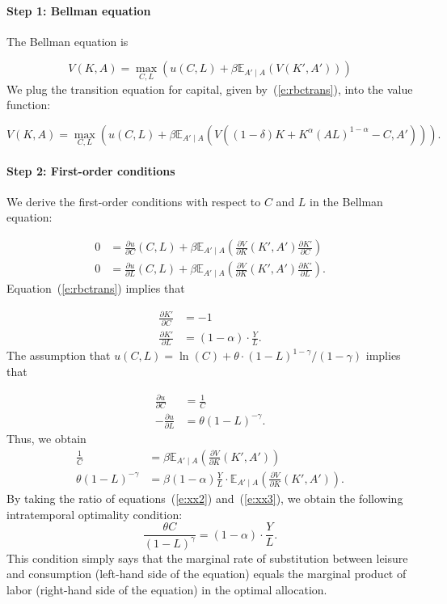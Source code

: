 \documentclass{article}
\begin{document}
\paragraph{Step 1: Bellman equation} The Bellman equation is

\[
V(K,A) = \max_{C,L}\left(u(C,L) +\beta \mathbb{E}_{A'\mid A}\left(V(K',A')\right)\right)
\]
We plug the transition equation for capital, given by~(\ref{e:rbctrans}), into the value function:

\[
V(K,A) = \max_{C,L}\left(u(C,L)+\beta \mathbb{E}_{A'\mid A}\left(V\left((1-\delta) K+K^{\alpha} (A L)^{1-\alpha}-C, A'\right)\right)\right).
\]

\paragraph{Step 2: First-order conditions} We derive the first-order conditions with respect to $C$ and $L$ in the Bellman equation:

\[
\begin{align*}
0&= \frac{\partial u}{\partial C}(C,L) +\beta \mathbb{E}_{A'\mid A}\left(\frac{\partial V}{\partial K}(K',A') \frac{\partial K'}{\partial C}\right)\\
0&=\frac{\partial u}{\partial L}(C,L) +\beta \mathbb{E}_{A'\mid A}\left(\frac{\partial V}{\partial K}(K',A') \frac{\partial K'}{\partial L}\right).
\end{align*}
\]
Equation~(\ref{e:rbctrans}) implies that

\[
\begin{align*}
\frac{\partial K'}{\partial C}&=-1\\
\frac{\partial K'}{\partial L}&=(1-\alpha)\cdot \frac{Y}{L}.
\end{align*}
\]
The assumption that $u(C,L)=\ln\left(C\right)+\theta\cdot (1-L)^{1-\gamma}/(1-\gamma)$ implies that

\[
\begin{align*}
\frac{\partial u}{\partial C}&=\frac{1}{C}\\
-\frac{\partial u}{\partial L}&=\theta (1-L)^{-\gamma}.
\end{align*}
\]
Thus, we obtain
\wcSpan*[id=equation-27]{}
\setcounter{tpequation}{26}\label{e:xx2}
\setcounter{tpequation}{27}\label{e:xx3}
\[
\begin{align*}
\frac{1}{C}&=\beta \mathbb{E}_{A'\mid A}\left(\frac{\partial V}{\partial K}(K',A')\right)\tag{27}\\
\theta (1-L)^{-\gamma}&=\beta (1-\alpha) \frac{Y}{L}\cdot \mathbb{E}_{A'\mid A}\left(\frac{\partial V}{\partial K}(K',A')\right).\tag{28}
\end{align*}
\]
By taking the ratio of equations~(\ref{e:xx2}) and~(\ref{e:xx3}), we obtain the following intratemporal optimality condition:
\wcSpan*[id=equation-29]{}
\setcounter{tpequation}{28}\label{e:intra}
\[
\frac{\theta C}{(1-L)^{\gamma}}=(1-\alpha) \cdot \frac{Y}{L} .\tag{29}
\]
This condition simply says that the marginal rate of substitution between leisure and consumption (left-hand side of the equation) equals the marginal product of labor (right-hand side of the equation) in the optimal allocation.
\end{document}
